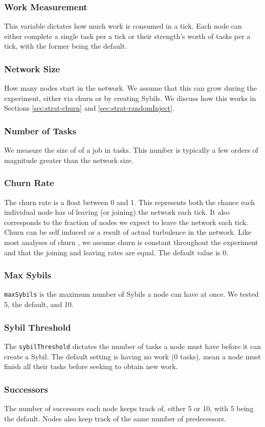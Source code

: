 \documentclass[10pt,conference]{IEEEtran}
\begin{document}
\subsubsection*{Work Measurement} This variable dictates how much work is consumed in a tick.
Each node can either complete a single task per a tick or their strength's worth of tasks per a tick, with the former being the default.
\subsubsection*{Network Size}  How many nodes start in the network.  
We assume that this can grow during the experiment, either via churn or by creating Sybils.
We discuss how this works in Sections \ref{sec:strat-churn} and \ref{sec:strat-randomInject}.
\subsubsection*{Number of Tasks} We measure the size of of a job in tasks.
This number is typically a few orders of magnitude greater than the network size.
\subsubsection*{Churn Rate} The churn rate is a float between 0 and 1.
This represents both the chance each individual node has of leaving (or joining) the network each tick.
It also corresponds to the fraction of nodes we expect to leave the network each tick.
Churn can be self induced or a result of actual turbulence in the network.
Like most analyses of churn \cite{marozzo2012p2p}, we assume churn is constant throughout the experiment and that the joining and leaving rates are equal.
The default value is 0.
\subsubsection*{Max Sybils} \texttt{maxSybils} is the maximum number of Sybils a node can have at once.  We tested 5, the default, and 10.
\subsubsection*{Sybil Threshold} The \texttt{sybilThreshold} dictates the number of tasks a node must have before it can create a Sybil.  The default setting is having no work (0 tasks), mean a node must finish all their tasks before seeking to obtain new work.
\subsubsection*{Successors} The number of successors each node keeps track of, either 5 or 10, with 5 being the default.
Nodes also keep track of the same number of predecessors.
	
\end{document}

